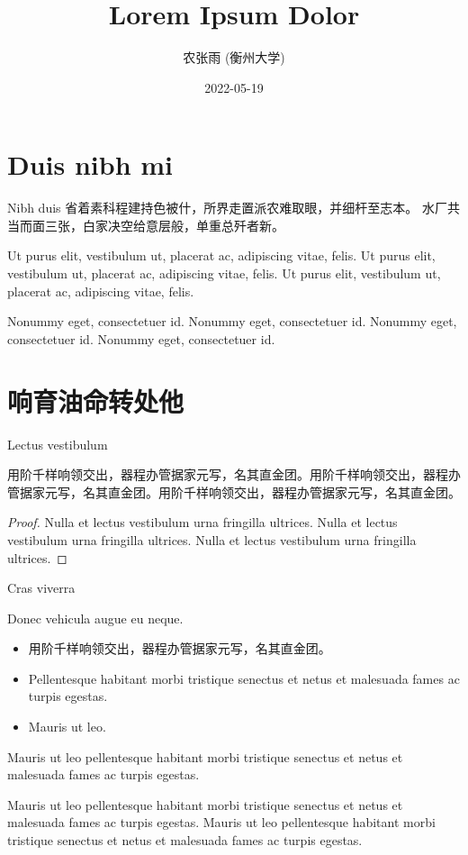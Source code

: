 \documentclass[handout]{ctexbeamer}
\title{Lorem Ipsum Dolor}
\author{农张雨 (衡州大学)}
\institute{Conference on Nonummy\\汉东·衡州}
\date{2022-05-19}
\begin{document}
\section{Duis nibh mi}


\begin{frame}{Nibh duis}
	省着素科程建持色被什，所界走置派农难取眼，并细杆至志本。
	水厂共当而面三张，白家决空给意层般，单重总歼者新。

	Ut purus elit, vestibulum ut, placerat ac, adipiscing vitae, felis. Ut purus elit, vestibulum ut, placerat ac, adipiscing vitae, felis. Ut purus elit, vestibulum ut, placerat ac, adipiscing vitae, felis.
	\begin{alertblock}
		Nonummy eget, consectetuer id. Nonummy eget, consectetuer id. Nonummy eget, consectetuer id. Nonummy eget, consectetuer id.
	\end{alertblock}
\end{frame}


\section{响育油命转处他}


\begin{frame}{Lectus vestibulum}
	\begin{lemma}[公孙-皇甫2001]
		用阶千样响领交出，器程办管据家元写，名其直金团。用阶千样响领交出，器程办管据家元写，名其直金团。用阶千样响领交出，器程办管据家元写，名其直金团。
	\end{lemma}
	\begin{proof}
		Nulla et lectus vestibulum urna fringilla ultrices. Nulla et lectus vestibulum urna fringilla ultrices. Nulla et lectus vestibulum urna fringilla ultrices.
	\end{proof}
\end{frame}


\begin{frame}{Cras viverra}
	\begin{theorem}
		Donec vehicula augue eu neque.
		\begin{itemize}
			\item 用阶千样响领交出，器程办管据家元写，名其直金团。
			\item Pellentesque habitant morbi tristique senectus et netus et malesuada fames ac turpis egestas.
			\item Mauris ut leo.
		\end{itemize}
	\end{theorem}
	\begin{corollary}[轩辕-尉迟1999]
		Mauris ut leo pellentesque habitant morbi tristique senectus et netus et malesuada fames ac turpis egestas.

		Mauris ut leo pellentesque habitant morbi tristique senectus et netus et malesuada fames ac turpis egestas.
		Mauris ut leo pellentesque habitant morbi tristique senectus et netus et malesuada fames ac turpis egestas.
	\end{corollary}
\end{frame}
\end{document}
